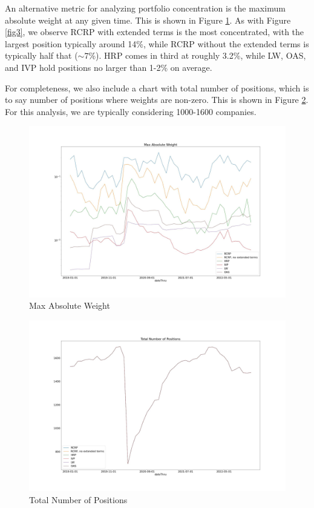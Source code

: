 \documentclass[10pt,twoside,titlepage]{article}   %
\begin{document}
An alternative metric for analyzing portfolio concentration is the maximum absolute weight at any given time. 
This is shown in Figure \ref{fig4}. 
As with Figure \ref{fig3}, we observe RCRP with extended terms is the most concentrated, 
with the largest position typically around 14\%, while RCRP without the extended terms is typically half that ($\sim7$\%). 
HRP comes in third at roughly 3.2\%, while LW, OAS, and IVP hold positions no larger than 1-2\% on average.



For completeness, we also include a chart with total number of positions, 
which is to say number of positions where weights are non-zero. 
This is shown in Figure \ref{fig5}. 
For this analysis, we are typically considering 1000-1600 companies.

\noindent
\begin{figure}[H]
\includegraphics[width = 1.0\textwidth]{image4.jpg} 
\vspace{-1.75\baselineskip}
\caption{Max Absolute Weight}
\label{fig4}
\end{figure}

\noindent 
\begin{figure}[H]
\includegraphics[width = 1.0\textwidth]{image5.jpg}
\vspace{-1.75\baselineskip}
\caption{Total Number of Positions}
\label{fig5}
\end{figure}
\end{document}

